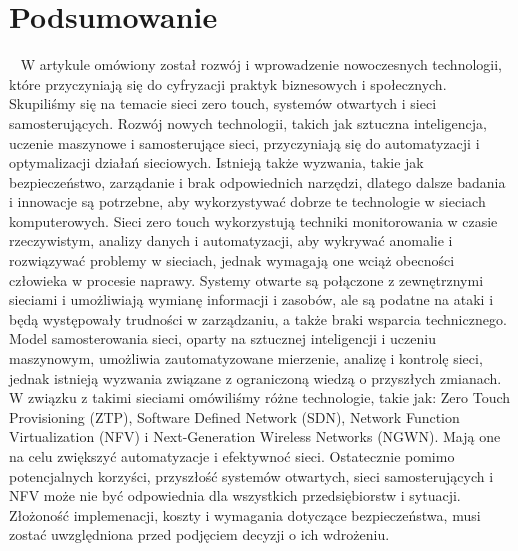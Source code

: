 \documentclass[sn-mathphys,Numbered]{sn-jnl}
\theoremstyle{thmstyleone}%
\theoremstyle{thmstyletwo}%
\theoremstyle{thmstylethree}%
\begin{document}
\section{Podsumowanie}
~ W artykule omówiony został rozwój i wprowadzenie nowoczesnych technologii, które przyczyniają się do cyfryzacji praktyk biznesowych i społecznych. Skupiliśmy się na temacie sieci zero touch, systemów otwartych i sieci samosterujących. Rozwój nowych technologii, takich jak sztuczna inteligencja, uczenie maszynowe i samosterujące sieci, przyczyniają się do automatyzacji i optymalizacji działań sieciowych. Istnieją także wyzwania, takie jak bezpieczeństwo, zarządanie i brak odpowiednich narzędzi, dlatego dalsze badania i innowacje są potrzebne, aby wykorzystywać dobrze te technologie w sieciach komputerowych. Sieci zero touch wykorzystują techniki monitorowania w czasie rzeczywistym, analizy danych i automatyzacji, aby wykrywać anomalie i rozwiązywać problemy w sieciach, jednak wymagają one wciąż obecności człowieka w procesie naprawy. Systemy otwarte są połączone z zewnętrznymi sieciami i umożliwiają wymianę informacji i zasobów, ale są podatne na ataki i będą występowały trudności w zarządzaniu, a także braki wsparcia technicznego. Model samosterowania sieci, oparty na sztucznej inteligencji i uczeniu maszynowym, umożliwia zautomatyzowane mierzenie, analizę i kontrolę sieci, jednak istnieją wyzwania związane z ograniczoną wiedzą o przyszłych zmianach. W związku z takimi sieciami omówiliśmy różne technologie, takie jak:  Zero Touch Provisioning (ZTP), Software Defined Network (SDN), Network Function Virtualization (NFV) i Next-Generation Wireless Networks (NGWN). Mają one na celu zwiększyć automatyzacje i efektywnoć sieci. Ostatecznie pomimo potencjalnych korzyści, przyszłość systemów otwartych, sieci samosterujących i NFV może nie być odpowiednia dla wszystkich przedsiębiorstw i sytuacji. Złożoność implemenacji, koszty i wymagania dotyczące bezpieczeństwa, musi zostać uwzględniona przed podjęciem decyzji o ich wdrożeniu.

\newpage

\end{document}
